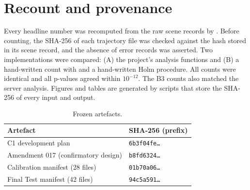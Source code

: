 \section{Recount and provenance}\label{sec:s-recount}

Every headline number was recomputed from the raw scene records by . Before counting, the SHA-256 of each trajectory file was checked against the hash stored in its scene record, and the absence of error records was asserted. Two implementations were compared: (A) the project's analysis functions and (B) a hand-written count with  and a hand-written Holm procedure. All counts were identical and all p-values agreed within $10^{-12}$. The B3 counts also matched the server analysis. Figures and tables are generated by scripts that store the SHA-256 of every input and output.

\begin{table}[!htbp]
\centering\footnotesize
\caption{Frozen artefacts.}\label{tab:s-hash}
\begin{tabular}{ll}
\toprule
Artefact & SHA-256 (prefix)\\
\midrule
C1 development plan & \texttt{6b3f04fe\ldots}\\
Amendment 017 (confirmatory design) & \texttt{b8fd6324\ldots}\\
Calibration manifest (28 files) & \texttt{01b70a06\ldots}\\
Final Test manifest (42 files) & \texttt{94c5a591\ldots}\\
\bottomrule
\end{tabular}
\end{table}

